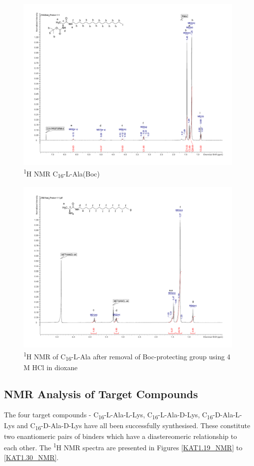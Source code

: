 \begin{figure}[ht!]
\centering
\includegraphics[scale=0.47]{NMR/KAT1_16.pdf}
\caption{\textsuperscript{1}H NMR C\textsubscript{16}-L-Ala(Boc)}
\label{KAT1.16_NMR}
\end{figure}
\begin{figure}[ht!]
\centering
\includegraphics[scale=0.47]{NMR/KAT1_17.pdf}
\caption{\textsuperscript{1}H NMR of C\textsubscript{16}-L-Ala after removal of Boc-protecting group using 4 M HCl in dioxane}
\label{KAT1.17_NMR}
\end{figure}

\newpage
\subsection{NMR Analysis of Target Compounds}
The four target compounds - C\textsubscript{16}-L-Ala-L-Lys, C\textsubscript{16}-L-Ala-D-Lys, C\textsubscript{16}-D-Ala-L-Lys and C\textsubscript{16}-D-Ala-D-Lys have all been successfully synthesised. These constitute two enantiomeric pairs of binders which have a diastereomeric relationship to each other. The \textsuperscript{1}H NMR spectra are presented in Figures \ref{KAT1.19_NMR} to \ref{KAT1.30_NMR}. 

